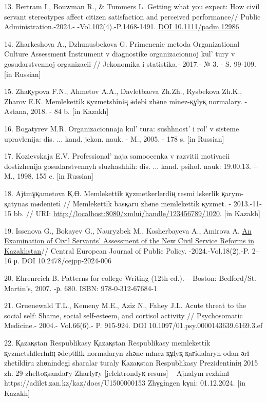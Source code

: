 13. Bertram I., Bouwman R., \& Tummers L. Getting what you expect: How
civil servant stereotypes affect citizen satisfaction and perceived
performance// Public Administration.-2024.- -Vol.102(4).-P.1468-1491.
\href{https://doi.org/10.1111/padm.12986}{DOI 10.1111/padm.12986}

14. Zharkeshova A., Dzhunusbekova G. Primenenie metoda Organizational
Culture Assessment Instrument v diagnostike organizacionnoj
kul' tury v gosudarstvennoj organizacii // Jekonomika i
statistika.- 2017.- № 3. - S. 99-109.{[}in Russian{]}

15. Zhaқypova F.N., Ahmetov A.A., Davletbaeva Zh.Zh., Rysbekova Zh.K.,
Zharov E.K. Memlekettіk қyzmetshіnің әdebі zhәne mіnez-құlyқ normalary.
-Astana, 2018. - 84 b. {[}in Kazakh{]}

16. Bogatyrev M.R. Organizacionnaja kul' tura:
sushhnost'{} i rol'{} v sisteme
upravlenija: dis. ... kand. jekon. nauk. - M., 2005. - 178 s. {[}in
Russian{]}

17. Kozievskaja E.V. Professional' naja samoocenka v
razvitii motivacii dostizhenija gosudarstvennyh sluzhashhih: dis. ...
kand. psihol. nauk: 19.00.13. -- M., 1998. 155 c. {[}in Russian{]}

18. Ajtmұқametova Қ.Ө. Memlekettіk қyzmetkerlerdің resmi іskerlіk
қarym-қatynas mәdenietі // Memlekettіk basқaru zhәne memlekettіk қyzmet.
- 2013.-11-15 bb. // URI:
\url{http://localhost:8080/xmlui/handle/123456789/1020}. {[}in Kazakh{]}

19. Issenova G., Bokayev G., Nauryzbek M., Kosherbayeva A., Amirova A.
\href{https://www.scopus.com/record/display.uri?eid=2-s2.0-85208677871&origin=resultslist&sort=plf-f&src=s&sot=b&sdt=b&s=TITLE\%28An+Examination+of+Civil+Servants\%E2\%80\%99+Assessment+of++the+New+Civil+Service+Reforms+in+Kazakhstan\%29&sessionSearchId=9294c12779ee47479a1a0997e8991897&relpos=0}{\hfill\break
An Examination of Civil Servants'{} Assessment of the New
Civil Service Reforms in Kazakhstan}// Central European Journal of
Public Policy. -2024.-Vol.18(2).-P. 2--16 р. DOI 10.2478/cejpp-2024-006

20. Ehrenreich B. Patterns for college Writing (12th ed.). -- Boston:
Bedford/St. Martin's, 2007. -р. 680. ISBN: 978-0-312-67684-1

21. Gruenewald T.L., Kemeny M.E., Aziz N., Fahey J.L. Acute threat to
the social self: Shame, social self-esteem, and cortisol activity //
Psychosomatic Medicine.- 2004.- Vol.66(6).- P. 915-924. DOI
10.1097/01.psy.0000143639.6169.3.ef

22. Қazaқstan Respublikasy Қazaқstan Respublikasy memlekettіk
қyzmetshіlerіnің әdeptіlіk normalaryn zhәne mіnez-құlyқ қaғidalaryn odan
әrі zhetіldіru zhөnіndegі sharalar turaly Қazaқstan Respublikasy
Prezidentіnің 2015 zh. 29 zheltoқsandaғy Zharlyғy {[}jelektrondyқ
resurs{]} -- Ajnalym rezhimі https://adilet.zan.kz/kaz/docs/U1500000153
Zhүgіngen kүnі: 01.12.2024. {[}in Kazakh{]}


